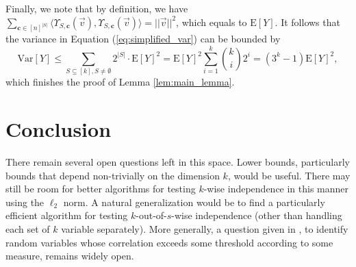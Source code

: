 \def\draft{0}  \documentclass[proceedings]{stacs}
\theoremstyle{plain}\newtheorem{satz}[thm]{Satz}
\theoremstyle{definition}\newtheorem{crucial}[thm]{Crucial Definition}
\newcommand{\vecv}{{\vec{v}} }
\newcommand{\bfc}{{\mathbf c} }
\newcommand{\Var}{{\mathrm{Var}} }
\begin{document}
Finally, we note that by definition,  we have $\sum_{\bfc \in [n]^{|S|}} \langle\Upsilon_{S,\bfc}(\vec v), \Upsilon_{S,\bfc}(\vec v)\rangle = ||\vecv||^2$, which equals to $\mathrm E[Y]$. It follows that the variance in Equation (\ref{eq:simplified_var}) can be bounded by
$$\Var[Y] \leq \sum_{S \subseteq [k], S \neq \emptyset} 2^{|S|} \cdot \mathrm E[Y]^2 = \mathrm E[Y]^2 \sum_{i=1}^k {k \choose i}2^i = (3^k-1)\mathrm E[Y]^2,$$
which finishes the proof of Lemma \ref{lem:main_lemma}.

\section{Conclusion}

There remain several open questions left in this space.  Lower bounds,
particularly bounds that depend non-trivially on the dimension $k$,
would be useful.  There may still be room for better algorithms for
testing $k$-wise independence in this manner using the $\ell_2$ norm.
A natural generalization would be to find a
particularly efficient algorithm for testing $k$-out-of-$s$-wise
independence (other than handling each set of $k$ variable
separately).  More generally, a question given in \cite{IM08}, to
identify random variables whose correlation exceeds some threshold
according to some measure, remains widely open.





{\footnotesize

}
\vspace{-1cm}
\end{document}
